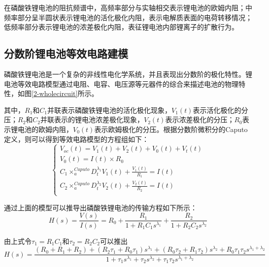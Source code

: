 在磷酸铁锂电池的阻抗频谱中，高频率部分与实轴相交表示锂电池的欧姆内阻；中频率部分呈半圆状表示锂电池的活化极化内阻，表示电解质表面的电荷转移情况；低频率部分表示锂电池的浓差极化内阻，表征锂电池内部锂离子的扩散行为。
\subsection{分数阶锂电池等效电路建模}
磷酸铁锂电池是一个复杂的非线性电化学系统，并且表现出分数阶的极化特性。锂电池等效电路模型通过电阻、电容、电压源等元器件的综合来描述电池的物理特性，如图\ref{2-wholecircuit}所示。

其中，${{R}_{1}}$和${{C}_{1}}$并联表示磷酸铁锂电池的活化极化现象，${{V}_{1}}(t)$表示活化极化的分压；${{R}_{2}}$和${{C}_{2}}$并联表示的锂电池浓差极化现象，${{V}_{2}}(t)$表示浓差极化的分压；${{R}_{0}}$表示锂电池的欧姆内阻，${{V}_{0}}(t)$表示欧姆极化的分压。根据分数阶微积分的Caputo定义，则可以得到等效电路模型的方程组如下：
\begin{equation}
\left\{ \begin{array}{l}
   {{V}_{oc}}(t)={{V}_{1}}(t)+{{V}_{2}}(t)+{{V}_{0}}(t)+{{V}_{t}}(t) \\ 
  {{V}_{0}}(t)=I(t)\times {{R}_{0}} \\ 
  {{C}_{1}}\times _{a}^{Caputo}D_{t}^{{{\lambda }_{1}}}{{V}_{1}}(t)+\frac{{{V}_{1}}(t)}{{{R}_{1}}}=I(t) \\ 
  {{C}_{2}}\times _{a}^{Caputo}D_{t}^{{{\lambda }_{2}}}{{V}_{2}}(t)+\frac{{{V}_{2}}(t)}{{{R}_{2}}}=I(t) \\ 
 \end{array} \right.
\end{equation}

通过上面的模型可以推导出磷酸铁锂电池的传输方程如下所示：
\begin{equation}
H(s)=\frac{V(s)}{I(s)}={{R}_{0}}+\frac{{{R}_{1}}}{1+{{R}_{1}}{{C}_{1}}{{s}^{{{\lambda }_{1}}}}}+\frac{{{R}_{2}}}{1+{{R}_{2}}{{C}_{2}}{{s}^{{{\lambda }_{2}}}}}
\end{equation}	 

由上式令${{\tau }_{1}}={{R}_{1}}{{C}_{1}}$和${{\tau }_{2}}={{R}_{2}}{{C}_{2}}$可以推出
\begin{equation}
H\left( s \right)=\frac{\left( {{R}_{0}}+{{R}_{1}}+{{R}_{2}} \right)+\left( {{R}_{2}}{{\tau }_{1}}+{{R}_{0}}{{\tau }_{1}} \right){{s}^{{{\lambda }_{1}}}}+\left( {{R}_{0}}{{\tau }_{2}}+{{R}_{1}}{{\tau }_{2}} \right){{s}^{{{\lambda }_{2}}}}+{{R}_{0}}{{\tau }_{1}}{{\tau }_{2}}{{s}^{{{\lambda }_{1}}+{{\lambda }_{2}}}}}{1+{{\tau }_{1}}{{s}^{{{\lambda }_{1}}}}+{{\tau }_{2}}{{s}^{{{\lambda }_{2}}}}+{{\tau }_{1}}{{\tau }_{2}}{{s}^{{{\lambda }_{1}}+{{\lambda }_{2}}}}}
\end{equation}

